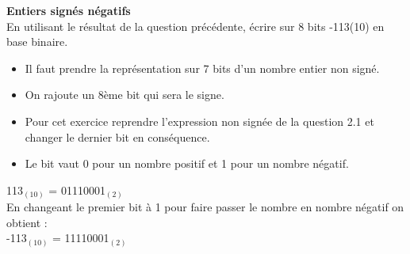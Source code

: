 \begin{Exercice}[15 minutes] \textbf{Entiers signés négatifs}\\
    En utilisant le résultat de la question précédente, écrire sur 8 bits -113(10) en base binaire. \\

    \begin{conseil}
        \begin{itemize}
        	\item Il faut prendre la représentation sur 7 bits d'un nombre entier non signé.
        	\item On rajoute un 8ème bit qui sera le signe.
        	\item Pour cet exercice reprendre l'expression non signée de la question 2.1 et changer le dernier bit en conséquence.
        	\item Le bit vaut 0 pour un nombre positif et 1 pour un nombre négatif.
        \end{itemize} 
    \end{conseil}
    
    \begin{solution}
         113$_{(10)}$ = 01110001$_{(2)}$ \\
         
         En changeant le premier bit à 1 pour faire passer le nombre en nombre négatif on obtient : \\
         
         -113$_{(10)}$ = 11110001$_{(2)}$ \\
    \end{solution}
\end{Exercice}

